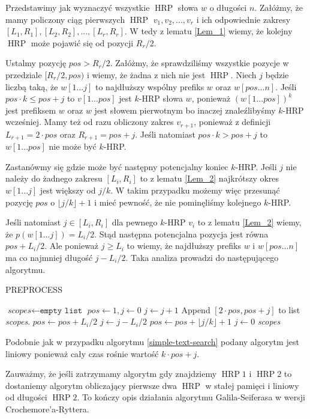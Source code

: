 \documentclass{article}
\DeclareMathOperator{\HRP}{HRP}
\begin{document}
Przedstawimy jak wyznaczyć wszystkie $\HRP$ słowa $w$ o długości $n$.
Załóżmy, że mamy policzony ciąg pierwszych $\HRP$ $v_1, v_2, ..., v_r$ i ich odpowiednie zakresy $[L_1, R_1], [L_2, R_2], ..., [L_r, R_r]$.
W tedy z lematu \ref{Lem_1} wiemy, że kolejny $\HRP$ może pojawić się od pozycji $R_r / 2$. 

Ustalmy pozycję $pos > R_r / 2$.
Załóżmy, że sprawdziliśmy wszystkie pozycje w przedziale $[R_r / 2, pos)$ i wiemy, że żadna z nich nie jest $\HRP$.
Niech $j$ będzie liczbą taką, że $w[1...j]$ to najdłuższy wspólny prefiks $w$ oraz $w[pos...n]$. 
Jeśli $pos \cdot k \leq pos + j$ to $v[1...pos]$ jest $k$-HRP słowa $w$, ponieważ $(w[1...pos])^k$ jest prefiksem $w$ oraz $w$ jest słowem pierwotnym bo inaczej znaleźlibyśmy $k$-HRP wcześniej.
Mamy też od razu obliczony zakres $v_{r+1}$, ponieważ z definicji $L_{r+1} = 2 \cdot pos$ oraz $R_{r+1} = pos + j$.
Jeśli natomiast $pos \cdot k > pos + j$ to $w[1...pos]$ nie może być $k$-HRP.

Zastanówmy się gdzie może być następny potencjalny koniec $k$-HRP.
Jeśli $j$ nie należy do żadnego zakresu $[L_i, R_i]$ to z lematu \ref{Lem_2} najkrótszy okres $w[1...j]$ jest większy od $j/k$. W takim przypadku możemy więc przesunąć pozycję $pos$ o $\lfloor j / k \rfloor + 1$ i mieć pewność, że nie pominęliśmy kolejnego $k$-HRP.

Jeśli natomiast $j \in [L_i, R_i]$ dla pewnego $k$-HRP $v_i$ to z lematu \ref{Lem_2} wiemy, że $p(w[1...j]) = L_i / 2$. Stąd następna potencjalna pozycja jest równa $pos + L_i / 2$. Ale ponieważ $j \geq L_i$ to wiemy, że najdłuższy prefiks $w$ i $w[pos...n]$ ma co najmniej długość $j - L_i / 2$. 
Taka analiza prowadzi do następującego algorytmu.

\begin{algorithm}[H]
\caption{PREPROCESS}
\label{preprocess}
\begin{algorithmic} 
\STATE $\textit{scopes} \gets \texttt{empty list}$
\STATE $pos \gets 1, j \gets 0$
        \STATE $j \gets j + 1$
    \ENDWHILE
        \STATE Append $[2 \cdot pos, pos + j]$ to list \textit{scopes}.
    \ENDIF
        \STATE $pos \gets pos + L_i / 2$
        \STATE $j \gets j - L_i / 2$
    \ELSE
        \STATE $pos \gets pos + \lfloor j / k \rfloor + 1$
        \STATE $j \gets 0$
    \ENDIF
\ENDWHILE
\RETURN \textit{scopes}
\end{algorithmic}
\end{algorithm}

Podobnie jak w przypadku algorytmu \ref{simple-text-search} podany algorytm jest liniowy ponieważ cały czas rośnie wartość $k \cdot pos + j$.

Zauważmy, że jeśli zatrzymamy algorytm gdy znajdziemy $\HRP1$ i $\HRP2$ to dostaniemy algorytm obliczający pierwsze dwa $\HRP$ w stałej pamięci i liniowy od długości $\HRP2$.
To kończy opis działania algorytmu Galila-Seiferasa w wersji Crochemore'a-Ryttera.
\end{document}
